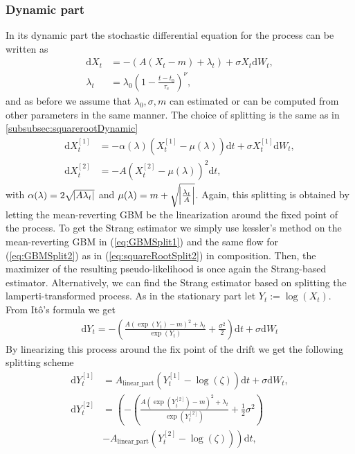 \subsubsection{Dynamic part}\label{subsubsec:meanrevertingGBMDynamic}
In its dynamic part the stochastic differential equation for the process can be written as
\begin{align}
    \mathrm{d}X_t &= -\left(A\left(X_t - m\right) + \lambda_t\right) + \sigma X_t \mathrm{d}W_t, \\
    \lambda_t &= \lambda_0\left(1 - \frac{t - t_0}{\tau_c}\right)^\nu,
\end{align}
and as before we assume that $\lambda_0, \sigma, m$ can estimated or can be computed from other parameters in the same manner. The choice of splitting is the same as in \ref{subsubsec:squarerootDynamic}
\begin{align}
    \mathrm{d}X_t^{[1]} &= -\alpha(\lambda)\left(X_t^{[1]} - \mu(\lambda)\right)  \mathrm{d}t + \sigma X_t^{[1]} \mathrm{d}W_t, \label{eq:GBMSplit1} \\
    \mathrm{d}X_t^{[2]} &= - A \left(X_t^{[2]} - \mu(\lambda)\right)^2 \mathrm{d}t, \label{eq:GBMSplit2}
\end{align}
with $\alpha(\lambda) = 2\sqrt{\abs{A\lambda_t}}$ and $\mu(\lambda) = m + \sqrt{\abs{\frac{\lambda_t}{A}}}$.
Again, this splitting is obtained by letting the mean-reverting GBM be the linearization around the fixed point of the process. To get the Strang estimator we simply use kessler's method on the mean-reverting GBM in (\ref{eq:GBMSplit1}) and the same flow for (\ref{eq:GBMSplit2}) as in (\ref{eq:squareRootSplit2}) in composition. Then, the maximizer of the resulting pseudo-likelihood is once again the Strang-based estimator.
Alternatively, we can find the Strang estimator based on splitting the lamperti-transformed process. As in the stationary part let $Y_t:=\log(X_t)$. From Itô's formula we get
\begin{align}
    \mathrm{d}Y_t = - \left(\frac{A\left(\exp\left(Y_t\right)-m\right)^2 + \lambda_t}{\exp(Y_t)} + \frac{\sigma^2}{2}\right)\mathrm{d}t + \sigma \mathrm{d}W_t
\end{align}
By linearizing this process around the fix point of the drift we get the following splitting scheme
\begin{align}
    \mathrm{d}Y_t^{[1]} &= A_{\mathrm{linear\_part}}\left(Y_t^{[1]} - \log\left(\zeta\right)\right)\mathrm{d}t + \sigma \mathrm{d}W_t,\\
    \mathrm{d}Y_t^{[2]} &= \left(-\left(\frac{A\left(\exp\left(Y_t^{[2]}\right)-m\right)^2 + \lambda_t}{\exp\left(Y_t^{[2]}\right)} + \frac{1}{2}\sigma^2\right) \right. \nonumber \\
     &- \left. A_{\mathrm{linear\_part}}\left(Y_t^{[2]} - \log\left(\zeta\right)\right)\right)\mathrm{d}t,
\end{align}
